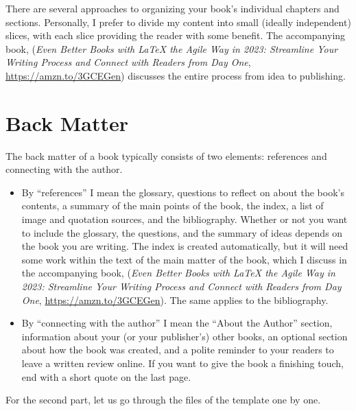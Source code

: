 There are several approaches to organizing your book's individual chapters and sections. Personally, I prefer to divide my content into small (ideally independent) slices, with each slice providing the reader with some benefit. The accompanying book, (\textit{Even Better Books with LaTeX the Agile Way in 2023: Streamline Your Writing Process and Connect with Readers from Day One}, \url{https://amzn.to/3GCEGen}) discusses the entire process from idea to publishing.


\section{Back Matter}
\label{backmatter:sec}

The back matter of a book typically consists of two elements: references and connecting with the author.

\begin{itemize}
    \item  By ``references'' I mean the glossary, questions to reflect on about the book's contents, a summary of the main points of the book, the index, a list of image and quotation sources, and the bibliography. Whether or not you want to include the glossary, the questions, and the summary of ideas depends on the book you are writing. The index is created automatically, but it will need some work within the text of the main matter of the book, which I discuss in the accompanying book, (\textit{Even Better Books with LaTeX the Agile Way in 2023: Streamline Your Writing Process and Connect with Readers from Day One}, \url{https://amzn.to/3GCEGen}). The same applies to the bibliography.

    \item By ``connecting with the author'' I mean the ``About the Author'' section, information about your (or your publisher's) other books, an optional section about how the book was created, and a polite reminder to your readers to leave a written review online. If you want to give the book a finishing touch, end with a short quote on the last page.
\end{itemize}

For the second part, let us go through the files of the template one by one.

